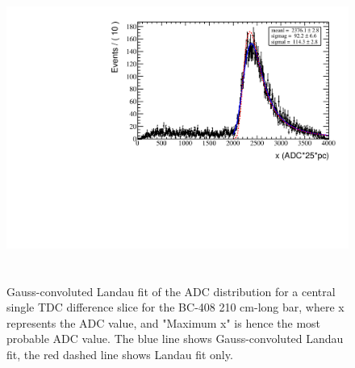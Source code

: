 \begin{figure}[ht!]
\centerline{\includegraphics[width=13cm,height=10cm]{ye/fig_ye_scintillator/ADC.pdf}}
\caption{Gauss-convoluted Landau fit of the ADC distribution for a central single TDC difference
slice for the BC-408 210 cm-long bar, where x represents the ADC value, and "Maximum
x" is hence the most probable ADC value. The blue line shows Gauss-convoluted Landau fit, the red dashed line shows Landau fit only.
 }
\label{f:ADC}
\end{figure}


